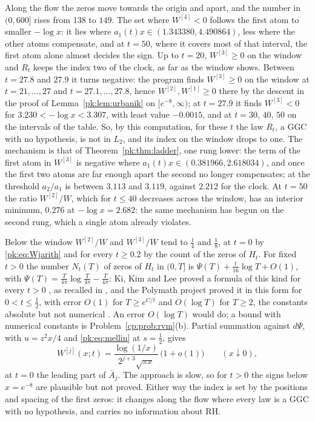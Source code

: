 Along the flow the zeros move towards the origin and apart, and the number in $(0,600]$ rises from $138$ to $149$. The set where $W^{[4]}<0$ follows the first atom to smaller $-\log x$: it lies where $a_1(t)x\in(1.343380,4.490864)$, less where the other atoms compensate, and at $t=50$, where it covers most of that interval, the first atom alone almost decides the sign. Up to $t=20$, $W^{[3]}\ge0$ on the window and $R_t$ keeps the index two of the clock, as far as the window shows. Between $t=27.8$ and $27.9$ it turns negative: the program finds $W^{[3]}\ge0$ on the window at $t=21,\dots,27$ and $t=27.1,\dots,27.8$, hence $W^{[2]},W^{[1]}\ge0$ there by the descent in the proof of Lemma~\ref{pk:lem:urbanik} on $[e^{-8},\infty)$; at $t=27.9$ it finds $W^{[3]}<0$ for $3.230<-\log x<3.307$, with least value $-0.0015$, and at $t=30$, $40$, $50$ on the intervals of the table. So, by this computation, for these $t$ the law $R_t$, a GGC with no hypothesis, is not in $L_2$, and its index on the window drops to one. The mechanism is that of Theorem~\ref{pk:thm:ladder}, one rung lower: the term of the first atom in $W^{[3]}$ is negative where $a_1(t)x\in(0.381966,2.618034)$, and once the first two atoms are far enough apart the second no longer compensates; at the threshold $a_2/a_1$ is between $3.113$ and $3.119$, against $2.212$ for the clock. At $t=50$ the ratio $W^{[2]}/W$, which for $t\le40$ decreases across the window, has an interior minimum, $0.276$ at $-\log x=2.682$: the same mechanism has begun on the second rung, which a single atom already violates.

Below the window $W^{[2]}/W$ and $W^{[3]}/W$ tend to $\frac14$ and $\frac18$, at $t=0$ by \eqref{pk:eq:Wjarith} and for every $t\ge0.2$ by the count of the zeros of $H_t$. For fixed $t>0$ the number $N_t(T)$ of zeros of $H_t$ in $(0,T]$ is $\Psi(T)+\frac t{16}\log T+O(1)$, with $\Psi(T)=\frac T{4\pi}\log\frac T{4\pi}-\frac T{4\pi}$: Ki, Kim and Lee proved a formula of this kind for every $t>0$ \cite[Theorem 1.4]{KKL09}, as recalled in \cite[Section 3]{RodgersTao}, and the Polymath project proved it in this form for $0<t\le\frac12$, with error $O(1)$ for $T\ge e^{C/t}$ and $O(\log T)$ for $T\ge2$, the constants absolute but not numerical \cite[Theorem 1.5]{Polymath}. An error $O(\log T)$ would do; a bound with numerical constants is Problem~\ref{cp:prob:rvm}(b). Partial summation against $d\Psi$, with $u=z^2x/4$ and \eqref{pk:eq:mellin} at $s=\frac12$, gives
\[
W^{[j]}(x;t)=\frac{\log(1/x)}{2^{j+3}\sqrt{\pi x}}\,\big(1+o(1)\big)\qquad(x\downarrow0),
\]
at $t=0$ the leading part of $\bar A_j$. The approach is slow, so for $t>0$ the signs below $x=e^{-8}$ are plausible but not proved. Either way the index is set by the positions and spacing of the first zeros: it changes along the flow where every law is a GGC with no hypothesis, and carries no information about RH.


